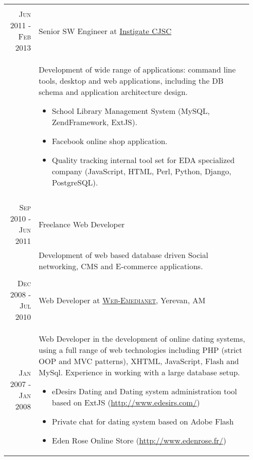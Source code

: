 \documentclass[a4paper,10pt]{article}
\begin{document}
\begin{tabular}{r|p{11cm}}
\multicolumn{2}{c}{} \\


\textsc{Jun 2011 - Feb 2013}
  & Senior SW Engineer at
    \href{http://www.instigatedesign.com/}{Instigate CJSC} \\

& \footnotesize{ Development of wide range of applications: command line tools,
desktop and web applications, including the DB schema and application
architecture design.
  \begin{itemize}
    \item School Library Management System (MySQL, ZendFramework, ExtJS).
    \item Facebook online shop application.
    \item Quality tracking internal tool set for EDA specialized company
          (JavaScript, HTML, Perl, Python, Django, PostgreSQL).
  \end{itemize}
} \\


\multicolumn{2}{c}{} \\


\textsc{Sep 2010 - Jun 2011}
  & Freelance Web Developer \\
  & \footnotesize{ Development of web based database driven Social networking,
    CMS and E-commerce applications.
} \\

  \multicolumn{2}{c}{} \\

  \textsc{Dec 2008 - Jul 2010}
    & Web Developer at
      \textsc{\href{http://web-emedianet.com/}{Web-Emedianet}}, Yerevan, AM \\
  \textsc{Jan 2007 - Jan 2008}
    & \footnotesize{ Web Developer in the development of online dating
      systems, using a full range of web technologies including PHP (strict OOP
      and MVC patterns), XHTML, JavaScript, Flash and MySql. Experience in
      working with a large database setup.
  \begin{itemize}
    \item eDesirs Dating and Dating system administration tool based on ExtJS
          (\href{http://www.edesirs.com/} {http://www.edesirs.com/})
    \item Private chat for dating system based on Adobe Flash
    \item Eden Rose Online Store
          (\href{http://www.edenrose.fr}{http://www.edenrose.fr/})
  \end{itemize}
} \\



\end{tabular}
\end{document}
